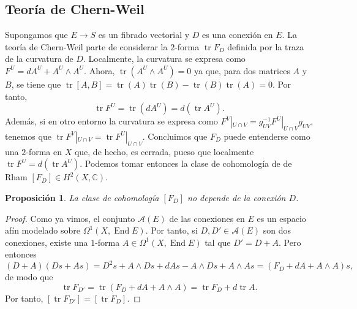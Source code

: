 \documentclass[12pt,a4paper]{article}
\newtheorem{prop}[thm]{Proposición}
\theoremstyle{definition} \newtheorem{defn}[thm]{Definición}
\theoremstyle{definition} \newtheorem{ejemplo}[thm]{Ejemplo}
\theoremstyle{definition} \newtheorem{ejercicio}[thm]{Ejercicio}
\def\CC{\mathbb{C}}
\DeclareMathOperator{\End}{End}
\DeclareMathOperator{\tr}{tr}
\begin{document}
\subsection{Teoría de Chern-Weil}
Supongamos que $E\rightarrow S$ es un fibrado vectorial y $D$ es una conexión en $E$. La teoría de Chern-Weil parte de considerar la $2$-forma $\tr F_D$ definida por la traza de la curvatura de $D$. Localmente, la curvatura se expresa como $F^U= dA^U + A^U \wedge A^U$. Ahora, $\tr (A^U \wedge A^U) = 0$ ya que, para dos matrices $A$ y $B$, se tiene que $\tr [A,B] = \tr(A)\tr(B) - \tr(B)\tr(A)=0$. Por tanto,
\begin{equation*}
  \tr F^U = \tr (dA^U) = d(\tr A^U).
\end{equation*}
Además, si en otro entorno la curvatura se expresa como $F^V|_{U\cap V} = g_{UV}^{-1} F^U|_{U\cap V} g_{UV}$, tenemos que $\tr F^V|_{U\cap V} = \tr F^U|_{U\cap V}$. Concluimos que $F_D$ puede entenderse como una $2$-forma en $X$ que, de hecho, es cerrada, pueso que localmente $\tr F^U = d(\tr A^U)$. Podemos tomar entonces la clase de cohomología de de Rham $[F_D] \in H^2(X,\CC)$.

\begin{prop}
  La clase de cohomología $[F_D]$ no depende de la conexión $D$.
\end{prop}

\begin{proof}
  Como ya vimos, el conjunto $\mathcal{A}(E)$ de las conexiones en $E$ es un espacio afín modelado sobre $\Omega^1(X,\End E)$. Por tanto, si $D,D' \in \mathcal{A}(E)$ son dos conexiones, existe una $1$-forma $A\in \Omega^1(X,\End E)$ tal que $D'=D+A$. Pero entonces
  \begin{equation*}
    (D+A)(Ds + As) = D^2 s + A\wedge Ds + dA s - A \wedge Ds + A\wedge A s = (F_D + dA + A\wedge A) s,
  \end{equation*}
  de modo que
  \begin{equation*}
    \tr F_{D'} = \tr(F_D + dA + A\wedge A) = \tr F_D + d\tr A.
  \end{equation*}
  Por tanto, $[\tr F_{D'}] = [\tr F_D]$.
\end{proof}
\end{document}
